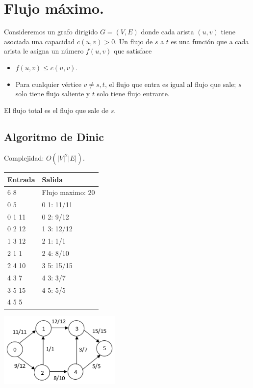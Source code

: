 \documentclass[12pt, letterpaper, twoside]{article}
\begin{document}
\newpage

\section{Flujo máximo.}

Consideremos un grafo dirigido $G = (V, E)$ donde cada arista $(u, v)$ tiene asociada una capacidad $c(u,v) > 0$. Un flujo de $s$ a $t$ es una función que a cada arista le asigna un número $f(u,v)$ que satisface
\begin{itemize}
\item $f(u, v) \leq c(u,v)$.
\item Para cualquier vértice $v \neq s, t$, el flujo que entra es igual al flujo que sale; $s$ solo tiene flujo saliente y $t$ solo tiene flujo entrante.
\end{itemize}
El flujo total es el flujo que sale de $s$.

\subsection{Algoritmo de Dinic}

Complejidad: $O(|V|^2|E|)$.

 \medskip

\begin{tabular}{|p{7cm}|p{7cm}|}
\hline
\textbf{Entrada} & \textbf{Salida}\\ \hline
6 8    & Flujo maximo: 20\\
0 5    & 0 1: 11/11\\ 
0 1 11 & 0 2: 9/12\\
0 2 12 & 1 3: 12/12\\
1 3 12 & 2 1: 1/1\\
2 1 1  & 2 4: 8/10\\
2 4 10 & 3 5: 15/15\\
4 3 7  & 4 3: 3/7\\
3 5 15 & 4 5: 5/5\\
4 5 5  & \\ \hline
\end{tabular}

\begin{center}
\includegraphics[width = 0.45\textwidth]{MaxFlow.png}
\end{center}
\end{document}
